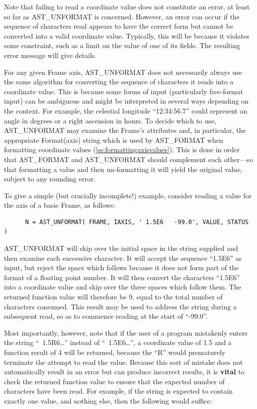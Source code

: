 \documentclass[twoside,11pt]{article}
\newcommand{\htmlref}[2]{#1}
\newcommand{\secref}[1]{\S\ref{#1}}
\renewcommand{\secref}[1]{\ref{#1}}
\begin{document}
Note that failing to read a coordinate value does not constitute an
error, at least so far as AST\_UNFORMAT is concerned. However, an
error can occur if the sequence of characters read appears to have the
correct form but cannot be converted into a valid coordinate
value. Typically, this will be because it violates some constraint,
such as a limit on the value of one of its fields. The resulting error
message will give details.

For any given Frame axis, AST\_UNFORMAT does not necessarily always
use the same algorithm for converting the sequence of characters it
reads into a coordinate value. This is because some forms of input
(particularly free-format input) can be ambiguous and might be
interpreted in several ways depending on the context. For example, the
celestial longitude ``12:34:56.7'' could represent an angle in degrees
or a right ascension in hours. To decide which to use, AST\_UNFORMAT
may examine the Frame's attributes and, in particular, the appropriate
\htmlref{Format(axis)}{Formataxis} string which is used by AST\_FORMAT when formatting
coordinate values (\secref{ss:formattingaxisvalues}). This is done in
order that AST\_FORMAT and AST\_UNFORMAT should complement each
other---so that formatting a value and then un-formatting it will
yield the original value, subject to any rounding error.

To give a simple (but crucially incomplete!) example, consider reading
a value for the axis of a basic Frame, as follows:

\small
\begin{verbatim}
      N = AST_UNFORMAT( FRAME, IAXIS, ' 1.5E6   -99.0', VALUE, STATUS )
\end{verbatim}
\normalsize

AST\_UNFORMAT will skip over the initial space in the string supplied
and then examine each successive character. It will accept the
sequence ``1.5E6'' as input, but reject the space which follows
because it does not form part of the format of a floating point
number. It will then convert the characters ``1.5E6'' into a
coordinate value and skip over the three spaces which follow them. The
returned function value will therefore be 9, equal to the total number
of characters consumed. This result may be used to address the string
during a subsequent read, so as to commence reading at the start of
``-99.0''.

Most importantly, however, note that if the user of a program
mistakenly enters the string ``~1.5R6\ldots'' instead of
``~1.5E6\ldots'', a coordinate value of 1.5 and a function result of 4
will be returned, because the ``R'' would prematurely terminate the
attempt to read the value. Because this sort of mistake does not
automatically result in an error but can produce incorrect results, it
is {\bf{vital}} to check the returned function value to ensure that
the expected number of characters have been read. For example, if the
string is expected to contain exactly one value, and nothing else,
then the following would suffice:
\end{document}
